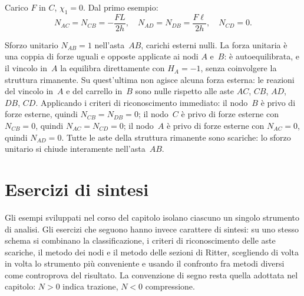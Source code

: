 \begin{esempio}
\begin{svolgimento}
		Carico $F$ in $C$, $\chi_1 = 0$.
		Dal primo esempio:
		\[
		N_{AC} = N_{CB} = -\frac{FL}{2h},
		\quad
		N_{AD} = N_{DB} = \frac{F\ell}{2h},
		\quad
		N_{CD} = 0.
		\]
		
		Sforzo unitario $N_{AB} = 1$ nell'asta~$AB$,
		carichi esterni nulli.
		La forza unitaria è una coppia di forze uguali
		e opposte applicate ai nodi $A$ e~$B$: è
		autoequilibrata, e il vincolo in~$A$ la equilibra
		direttamente con $H_A = -1$, senza coinvolgere
		la struttura rimanente.
		Su quest'ultima non agisce alcuna forza esterna:
		le reazioni del vincolo in~$A$ e del carrello
		in~$B$ sono nulle rispetto alle aste $AC$, $CB$,
		$AD$, $DB$, $CD$.
		Applicando i criteri di riconoscimento immediato:
		il nodo~$B$ è privo di forze esterne, quindi
		$N_{CB} = N_{DB} = 0$; il nodo~$C$ è privo di
		forze esterne con $N_{CB} = 0$, quindi
		$N_{AC} = N_{CD} = 0$; il nodo~$A$ è privo di
		forze esterne con $N_{AC} = 0$, quindi $N_{AD} = 0$.
		Tutte le aste della struttura rimanente sono
		scariche: lo sforzo unitario si chiude interamente
		nell'asta~$AB$.
	\end{svolgimento}
\end{esempio}

\section{Esercizi di sintesi}
\label{sec:esercizi_sintesi_reticolari}

Gli esempi sviluppati nel corso del capitolo isolano
ciascuno un singolo strumento di analisi. Gli esercizi
che seguono hanno invece carattere di sintesi: su uno
stesso schema si combinano la classificazione, i criteri
di riconoscimento delle aste scariche, il metodo dei nodi
e il metodo delle sezioni di Ritter, scegliendo di volta
in volta lo strumento più conveniente e usando il
confronto fra metodi diversi come controprova del
risultato. La convenzione di segno resta quella adottata
nel capitolo: $N>0$ indica trazione, $N<0$ compressione.

